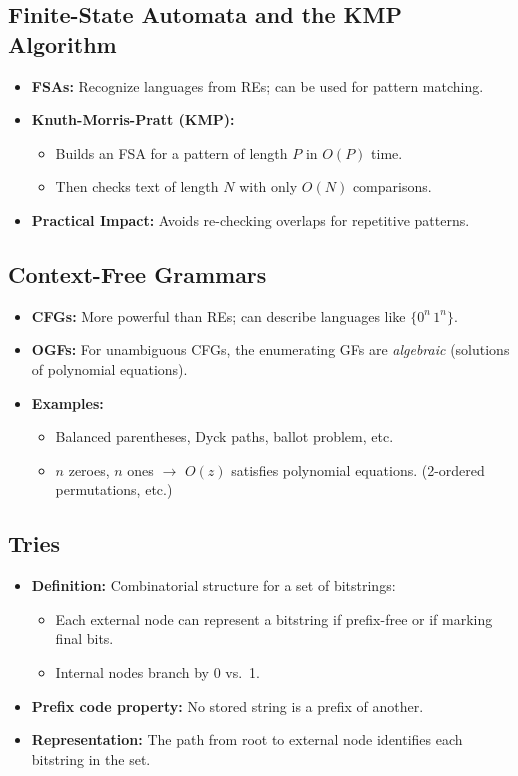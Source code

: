 \documentclass[11pt,letterpaper]{article}
\begin{document}
\subsection{Finite-State Automata and the KMP Algorithm}
\begin{itemize}
  \item \textbf{FSAs:} Recognize languages from REs; can be used for pattern matching.
  \item \textbf{Knuth-Morris-Pratt (KMP):}
    \begin{itemize}
      \item Builds an FSA for a pattern of length $P$ in $O(P)$ time.
      \item Then checks text of length $N$ with only $O(N)$ comparisons.
    \end{itemize}
  \item \textbf{Practical Impact:} Avoids re-checking overlaps for repetitive patterns.
\end{itemize}

\subsection{Context-Free Grammars}
\begin{itemize}
  \item \textbf{CFGs:} More powerful than REs; can describe languages like $\{0^n\,1^n\}$.
  \item \textbf{OGFs:} For unambiguous CFGs, the enumerating GFs are \emph{algebraic} (solutions of polynomial equations).
  \item \textbf{Examples:} 
    \begin{itemize}
      \item Balanced parentheses, Dyck paths, ballot problem, etc.
      \item $n$ zeroes, $n$ ones $\to$ $O(z)$ satisfies polynomial equations. (2-ordered permutations, etc.)
    \end{itemize}
\end{itemize}

\subsection{Tries}
\begin{itemize}
  \item \textbf{Definition:} Combinatorial structure for a set of bitstrings:
    \begin{itemize}
      \item Each external node can represent a bitstring if prefix-free or if marking final bits.
      \item Internal nodes branch by 0 vs.\ 1.
    \end{itemize}
  \item \textbf{Prefix code property:} No stored string is a prefix of another. 
  \item \textbf{Representation:} The path from root to external node identifies each bitstring in the set.
\end{itemize}
\end{document}
